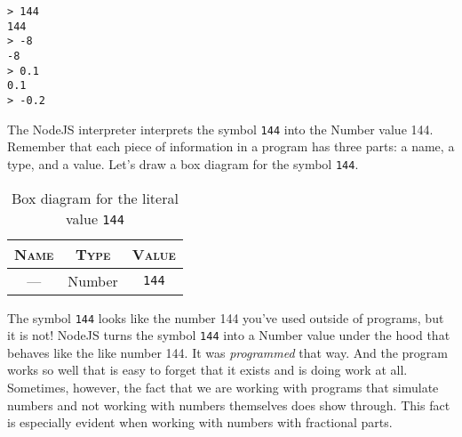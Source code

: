 
\suppresslinenumbers
\begin{lstlisting}
> 144
144
> -8
-8
> 0.1
0.1
> -0.2
\end{lstlisting}
\reactivatelinenumbers


The NodeJS interpreter interprets the symbol \texttt{144} into the \textsf{Number} value 144. Remember that each piece of information in a program has three parts: a name, a type, and a value. Let's draw a box diagram for the symbol \texttt{144}.

\begin{table}[h!]
  \begin{tabular}{|c|c|c|}
    \hline
    \textsc{Name} & \textsc{Type} & \textsc{Value}\\
    \hline
    --- & \textsf{Number} & \texttt{144}\\
    \hline
  \end{tabular}
  \caption{Box diagram for the literal value \texttt{144}}
\end{table}

The symbol \texttt{144} looks like the number 144 you've used outside of programs, but it is not! NodeJS turns the symbol \texttt{144} into a \textsf{Number} value under the hood that behaves like the like number 144. It was \emph{programmed} that way. And the program works so well that is easy to forget that it exists and is doing work at all. Sometimes, however, the fact that we are working with programs that simulate numbers and not working with numbers themselves does show through. This fact is especially evident when working with numbers with fractional parts.

